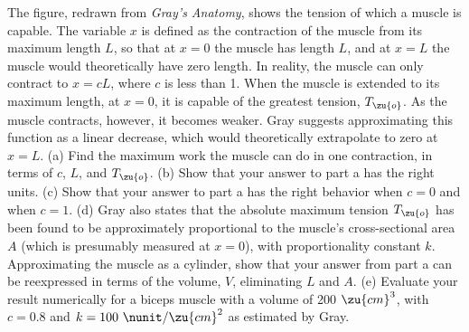 The figure, redrawn from \emph{Gray's Anatomy}, shows the tension of which a muscle is capable.
The variable $x$ is defined as the contraction of the muscle from its maximum length $L$, so that at
$x=0$ the muscle has length $L$, and at $x=L$ the muscle would theoretically have zero length.
In reality, the muscle can only contract to $x=cL$, where $c$ is less than 1.
When the muscle is extended to its maximum length, at $x=0$, it is capable of the greatest tension, $T_\zu{o}$.
As the muscle contracts, however, it becomes weaker. Gray suggests approximating this function as a linear
decrease, which would theoretically extrapolate to zero at $x=L$.
(a) Find the maximum work the muscle can do in one contraction, in terms of $c$, $L$, and $T_\zu{o}$.\answercheck\hwendpart
(b) Show that your answer to part a has the right units.\hwendpart
(c) Show that your answer to part a has the right behavior when $c=0$ and when $c=1$.\hwendpart
(d) Gray also states that the absolute maximum tension $T_\zu{o}$ has been found to be approximately
proportional to the muscle's cross-sectional area $A$ (which is presumably measured at $x=0$), with proportionality constant
$k$.
Approximating the muscle as a cylinder,
show that your answer from part a can be reexpressed in terms of the volume, $V$, eliminating $L$ and $A$.\answercheck\hwendpart
(e) Evaluate your result numerically for a biceps muscle with a volume of 200 $\zu{cm}^3$, with $c=0.8$ and
$k=100\ \nunit/\zu{cm}^2$ as estimated by Gray.\answercheck\hwendpart
